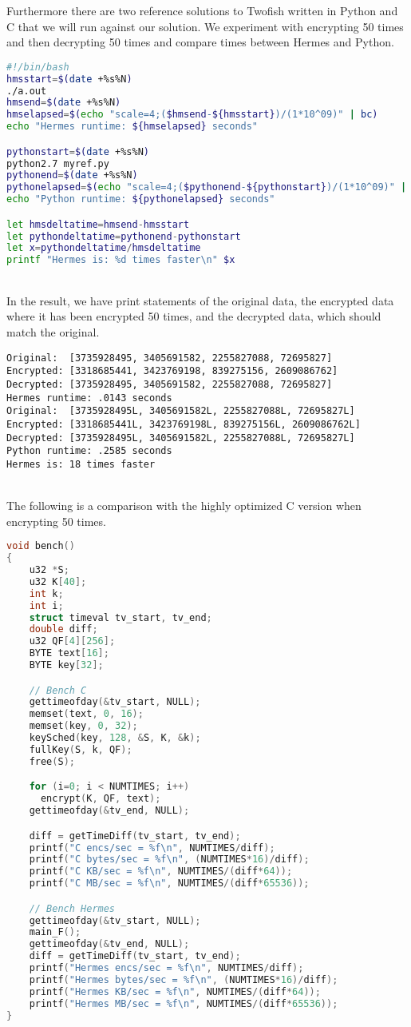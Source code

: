 \clearpage
\newpage
Furthermore there are two reference solutions to Twofish written in Python and C that we will run against our solution.
We experiment with encrypting 50 times and then decrypting 50 times and compare times between Hermes and Python.
\begin{lstlisting}[language=bash, float=htp]
#!/bin/bash
hmsstart=$(date +%s%N)
./a.out
hmsend=$(date +%s%N)
hmselapsed=$(echo "scale=4;($hmsend-${hmsstart})/(1*10^09)" | bc)
echo "Hermes runtime: ${hmselapsed} seconds"

pythonstart=$(date +%s%N)
python2.7 myref.py
pythonend=$(date +%s%N)
pythonelapsed=$(echo "scale=4;($pythonend-${pythonstart})/(1*10^09)" | bc)
echo "Python runtime: ${pythonelapsed} seconds"

let hmsdeltatime=hmsend-hmsstart
let pythondeltatime=pythonend-pythonstart
let x=pythondeltatime/hmsdeltatime
printf "Hermes is: %d times faster\n" $x
\end{lstlisting} \\
In the result, we have print statements of the original data, the encrypted data where it has been encrypted 50 times, and the decrypted data, which should match the original.
\begin{lstlisting}[float=htp]
Original:  [3735928495, 3405691582, 2255827088, 72695827]
Encrypted: [3318685441, 3423769198, 839275156, 2609086762]
Decrypted: [3735928495, 3405691582, 2255827088, 72695827]
Hermes runtime: .0143 seconds
Original:  [3735928495L, 3405691582L, 2255827088L, 72695827L]
Encrypted: [3318685441L, 3423769198L, 839275156L, 2609086762L]
Decrypted: [3735928495L, 3405691582L, 2255827088L, 72695827L]
Python runtime: .2585 seconds
Hermes is: 18 times faster
\end{lstlisting} \\
The following is a comparison with the highly optimized C version when encrypting 50 times.
\begin{lstlisting}[language=C]
void bench()
{
    u32 *S;
    u32 K[40];
    int k;
    int i;
    struct timeval tv_start, tv_end;
    double diff;
    u32 QF[4][256];
    BYTE text[16];
    BYTE key[32];

    // Bench C
    gettimeofday(&tv_start, NULL);
    memset(text, 0, 16);
    memset(key, 0, 32);
    keySched(key, 128, &S, K, &k);
    fullKey(S, k, QF);
    free(S);

    for (i=0; i < NUMTIMES; i++)
      encrypt(K, QF, text);
    gettimeofday(&tv_end, NULL);

    diff = getTimeDiff(tv_start, tv_end);
    printf("C encs/sec = %f\n", NUMTIMES/diff);
    printf("C bytes/sec = %f\n", (NUMTIMES*16)/diff);
    printf("C KB/sec = %f\n", NUMTIMES/(diff*64));
    printf("C MB/sec = %f\n", NUMTIMES/(diff*65536));

    // Bench Hermes
    gettimeofday(&tv_start, NULL);
    main_F();
    gettimeofday(&tv_end, NULL);
    diff = getTimeDiff(tv_start, tv_end);
    printf("Hermes encs/sec = %f\n", NUMTIMES/diff);
    printf("Hermes bytes/sec = %f\n", (NUMTIMES*16)/diff);
    printf("Hermes KB/sec = %f\n", NUMTIMES/(diff*64));
    printf("Hermes MB/sec = %f\n", NUMTIMES/(diff*65536));
}
\end{lstlisting}
